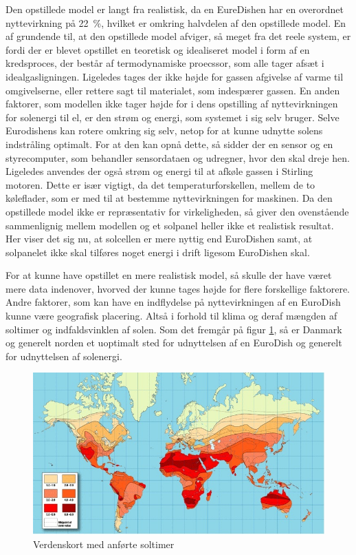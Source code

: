 \documentclass[SRC.tex]{subfiles}
\begin{document}
	Den opstillede model er langt fra realistisk, da en EureDishen har en overordnet nyttevirkning 
	på \SI{22}{\percent}, hvilket er omkring halvdelen af den opstillede model. %
	En af grundende til, at den opstillede model afviger, så meget fra det reele system, er fordi
	der er blevet opstillet en teoretisk og idealiseret model i form af en kredsproces, der består af termodynamiske proecssor, som alle tager afsæt i idealgasligningen. Ligeledes tages der ikke højde
	for gassen afgivelse af varme til omgivelserne, eller rettere sagt til materialet, som indespærer gassen. En anden faktorer, som modellen ikke tager højde for i dens opstilling af nyttevirkningen for solenergi til el, er den strøm og energi, som systemet i sig selv bruger. Selve Eurodishens kan rotere omkring sig selv, netop for at kunne udnytte solens indstråling optimalt. For at den kan opnå dette, så sidder der en sensor og en styrecomputer, som behandler sensordataen og udregner, hvor den skal dreje hen. Ligeledes anvendes der også strøm og energi til at afkøle gassen i Stirling motoren. Dette er især vigtigt, da det temperaturforskellen, mellem de to køleflader, som er med til at bestemme nyttevirkningen for maskinen. Da den opstillede model ikke er repræsentativ for virkeligheden, så giver den ovenstående sammenlignig mellem modellen og et solpanel heller ikke et realistisk resultat. Her viser det sig nu, at solcellen er mere nyttig end EuroDishen samt, at solpanelet ikke skal tilføres noget energi i drift ligesom EuroDishen skal. 
	
	For at kunne have opstillet en mere realistisk model, så skulle der have været mere data indenover, hvorved der kunne tages højde for flere forskellige faktorere. Andre faktorer, som kan have en indflydelse på nyttevirkningen af en EuroDish kunne være geografisk placering. Altså i forhold til klima og deraf mængden af soltimer og indfaldsvinklen af solen. Som det fremgår på figur \ref{fig:world-solar-isolation-map}, så er Danmark og generelt norden et uoptimalt sted for udnyttelsen af en EuroDish og generelt for udnyttelsen af solenergi. 
	
	\begin{figure}[h!]
		\centering
		\includegraphics[width=0.7\linewidth]{"Billeder/World solar isolation map"}
		\caption{Verdenskort med anførte soltimer}
		\label{fig:world-solar-isolation-map}
	\end{figure}
	
\end{document}
